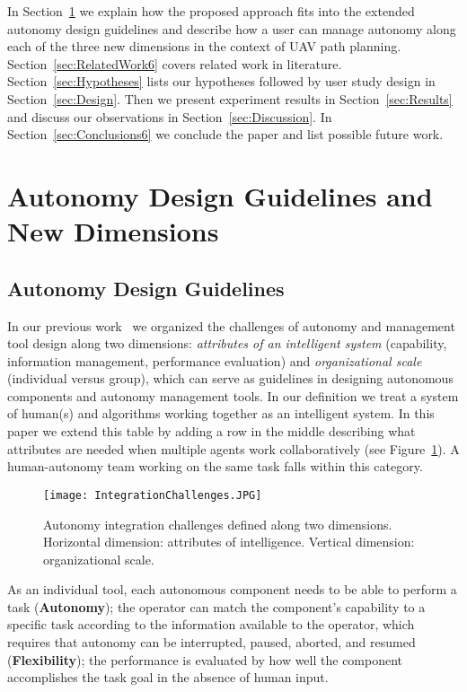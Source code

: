 In Section~\ref{sec:dimensions} we explain how the proposed approach fits into the extended autonomy design guidelines and describe how a user can manage autonomy along each of the three new dimensions in the context of UAV path planning. Section~\ref{sec:RelatedWork6} covers related work in literature. Section~\ref{sec:Hypotheses} lists our hypotheses followed by user study design in Section~\ref{sec:Design}. Then we present experiment results in Section~\ref{sec:Results} and discuss our observations in Section~\ref{sec:Discussion}. In Section~\ref{sec:Conclusions6} we conclude the paper and list possible future work.

\section{Autonomy Design Guidelines and New Dimensions}
\label{sec:dimensions}

\subsection{Autonomy Design Guidelines}

In our previous work~\cite{Lin2010Supporting} we organized the challenges of autonomy and management tool design along two dimensions: \textit{attributes of an intelligent system} (capability, information management, performance evaluation) and \textit{organizational scale} (individual versus group), which can serve as guidelines in designing autonomous components and autonomy management tools. In our definition we treat a system of human(s) and algorithms working together as an intelligent system. In this paper we extend this table by adding a row in the middle describing what attributes are needed when multiple agents work collaboratively (see Figure~\ref{IChallenges}). A human-autonomy team working on the same task falls within this category. 

\begin{figure}
\centering
\texttt{[image: IntegrationChallenges.JPG]}
\caption[Autonomy integration challenges]{Autonomy integration challenges defined along two dimensions. Horizontal dimension: attributes of intelligence. Vertical dimension: organizational scale.}
\label{IChallenges}
\end{figure}

As an individual tool, each autonomous component needs to be able to perform a task (\textbf{Autonomy}); the operator can match the component's capability to a specific task according to the information available to the operator, which requires that autonomy can be interrupted, paused, aborted, and resumed (\textbf{Flexibility}); the performance is evaluated by how well the component accomplishes the task goal in the absence of human input. 

